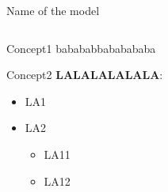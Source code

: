\documentclass[compress]{beamer}
\begin{document}
\begin{frame}{Name of the model\cite{zhou2022costly}}
\begin{columns}[c]
        \begin{column}{.5\textwidth}
            \raggedright
            \begin{minipage}{5.8cm}
                \begin{block}{Concept1}
                    babababbababababa
                \end{block}
                \begin{block}{Concept2}
                    \textbf{LALALALALALA}:\\
                    \begin{itemize}
                        \item LA1
                        \item LA2
                        \begin{itemize}
                        	\item LA11
                        	\item LA12
                        \end{itemize}
                    \end{itemize}
                \end{block}
            \end{minipage}
        \end{column}
    \end{columns}
\end{frame}

\begin{frame}
	\printbibliography
\end{frame}

\begin{frame}
    \titlepage
\end{frame}
\end{document}
